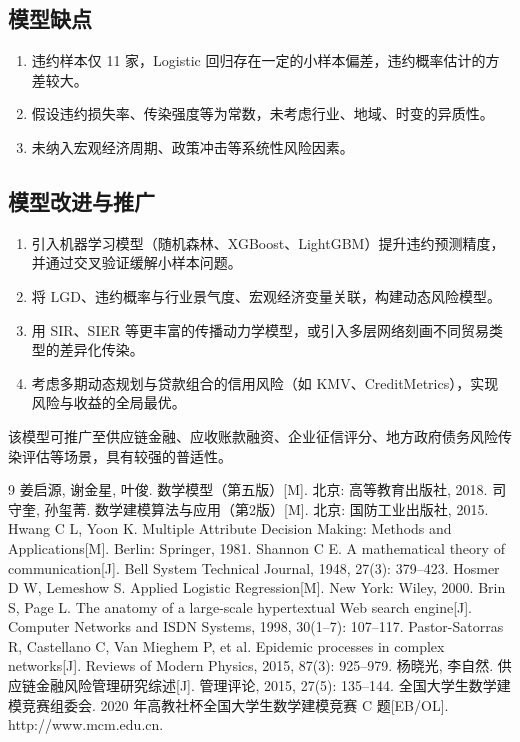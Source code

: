 \documentclass[12pt]{ctexart}
\begin{document}
\subsection{模型缺点}

\begin{enumerate}[label=(\arabic*),itemsep=2pt]
    \item 违约样本仅 11 家，Logistic 回归存在一定的小样本偏差，违约概率估计的方差较大。
    \item 假设违约损失率、传染强度等为常数，未考虑行业、地域、时变的异质性。
    \item 未纳入宏观经济周期、政策冲击等系统性风险因素。
\end{enumerate}

\subsection{模型改进与推广}

\begin{enumerate}[label=(\arabic*),itemsep=2pt]
    \item 引入机器学习模型（随机森林、XGBoost、LightGBM）提升违约预测精度，并通过交叉验证缓解小样本问题。
    \item 将 $\mathrm{LGD}$、违约概率与行业景气度、宏观经济变量关联，构建动态风险模型。
    \item 用 SIR、SIER 等更丰富的传播动力学模型，或引入多层网络刻画不同贸易类型的差异化传染。
    \item 考虑多期动态规划与贷款组合的信用风险（如 KMV、CreditMetrics），实现风险与收益的全局最优。
\end{enumerate}

该模型可推广至供应链金融、应收账款融资、企业征信评分、地方政府债务风险传染评估等场景，具有较强的普适性。

\begin{thebibliography}{9}
 姜启源, 谢金星, 叶俊. 数学模型（第五版）[M]. 北京: 高等教育出版社, 2018.
 司守奎, 孙玺菁. 数学建模算法与应用（第2版）[M]. 北京: 国防工业出版社, 2015.
 Hwang C L, Yoon K. Multiple Attribute Decision Making: Methods and Applications[M]. Berlin: Springer, 1981.
 Shannon C E. A mathematical theory of communication[J]. Bell System Technical Journal, 1948, 27(3): 379--423.
 Hosmer D W, Lemeshow S. Applied Logistic Regression[M]. New York: Wiley, 2000.
 Brin S, Page L. The anatomy of a large-scale hypertextual Web search engine[J]. Computer Networks and ISDN Systems, 1998, 30(1--7): 107--117.
 Pastor-Satorras R, Castellano C, Van Mieghem P, et al. Epidemic processes in complex networks[J]. Reviews of Modern Physics, 2015, 87(3): 925--979.
 杨晓光, 李自然. 供应链金融风险管理研究综述[J]. 管理评论, 2015, 27(5): 135--144.
 全国大学生数学建模竞赛组委会. 2020 年高教社杯全国大学生数学建模竞赛 C 题[EB/OL]. http://www.mcm.edu.cn.
\end{thebibliography}
\end{document}
